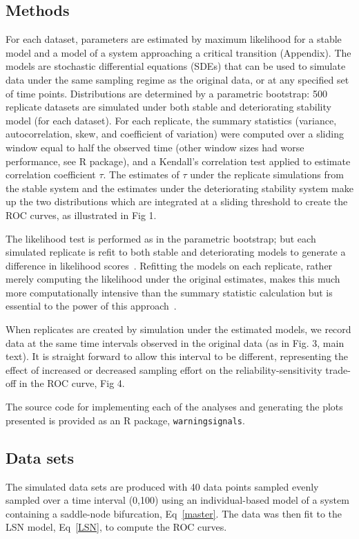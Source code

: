 \documentclass{pnastwo}
\begin{document}
\begin{article}
\begin{materials}
                               \subsection{Methods}\label{methods}
For each dataset, parameters are estimated by maximum likelihood for a stable model
and a model of a system approaching a critical transition (Appendix).
The models are stochastic differential equations (SDEs)
that can be used to simulate data under the same sampling regime as the original data, 
or at any specified set of time points.
Distributions are determined by a parametric bootstrap:
500 replicate datasets are simulated under both stable and deteriorating stability model (for each dataset).
For each replicate, the summary statistics (variance, autocorrelation, skew, and coefficient of variation)
were computed over a sliding window equal to half the observed time (other window sizes had worse performance, see R package), 
and a Kendall's correlation test applied to estimate correlation coefficient $\tau$.
The estimates of $\tau$ under the replicate simulations from the stable system
and the estimates under the deteriorating stability system
make up the two distributions which are integrated at a sliding threshold to create the ROC curves, as illustrated in Fig 1. 

The likelihood test is performed as in the parametric bootstrap; 
but each simulated replicate is refit to both stable and deteriorating models to generate a difference in likelihood scores~\cite{Cox1961}.
Refitting the models on each replicate, 
rather merely computing the likelihood under the original estimates,
makes this much more computationally intensive than the summary statistic calculation but is essential to the power of this approach~\cite{Huelsenbeck1996}.

When replicates are created by simulation under the estimated models,
we record data at the same time intervals observed in the original data (as in Fig. 3, main text). 
It is straight forward to allow this interval to be different,
representing the effect of increased or decreased sampling effort on the reliability-sensitivity trade-off in the ROC curve, Fig 4.

The source code for implementing each of the analyses and generating the plots presented is provided as an R package, \verb|warningsignals|. 


                               \subsection{Data sets}
The simulated data sets are produced with 40 data points
sampled evenly sampled over a time interval (0,100) using an individual-based model of a system containing a saddle-node bifurcation, Eq~\eqref{master}.
The data was then fit to the LSN model, Eq~\eqref{LSN}, to compute the ROC curves. 


\end{materials}
\end{article}
\end{document}
